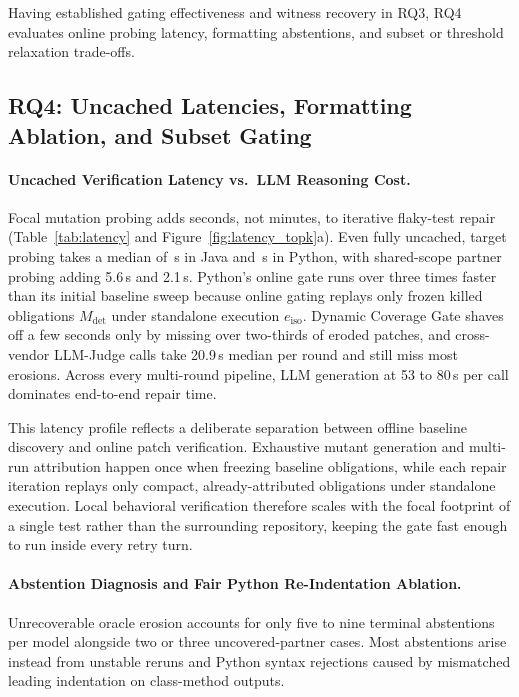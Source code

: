 Having established gating effectiveness and witness recovery in RQ3, RQ4 evaluates online probing latency, formatting abstentions, and subset or threshold relaxation trade-offs.

\subsection{RQ4: Uncached Latencies, Formatting Ablation, and Subset Gating}
\label{sec:rq4}

\paragraph{Uncached Verification Latency vs.\ LLM Reasoning Cost.}
Focal mutation probing adds seconds, not minutes, to iterative flaky-test repair (Table~\ref{tab:latency} and Figure~\ref{fig:latency_topk}a). Even fully uncached, target probing takes a median of \LatUncachedJavaMutMed\,s in Java and \LatUncachedPyMutMed\,s in Python, with shared-scope partner probing adding 5.6\,s and 2.1\,s. Python's online gate runs over three times faster than its initial baseline sweep because online gating replays only frozen killed obligations $M_{\text{det}}$ under standalone execution $e_{\text{iso}}$. Dynamic Coverage Gate shaves off a few seconds only by missing over two-thirds of eroded patches, and cross-vendor LLM-Judge calls take 20.9\,s median per round and still miss most erosions. Across every multi-round pipeline, LLM generation at 53 to 80\,s per call dominates end-to-end repair time.

This latency profile reflects a deliberate separation between offline baseline discovery and online patch verification. Exhaustive mutant generation and multi-run attribution happen once when freezing baseline obligations, while each repair iteration replays only compact, already-attributed obligations under standalone execution. Local behavioral verification therefore scales with the focal footprint of a single test rather than the surrounding repository, keeping the gate fast enough to run inside every retry turn.



\paragraph{Abstention Diagnosis and Fair Python Re-Indentation Ablation.}
Unrecoverable oracle erosion accounts for only five to nine terminal abstentions per model alongside two or three uncovered-partner cases. Most abstentions arise instead from unstable reruns and Python syntax rejections caused by mismatched leading indentation on class-method outputs.

